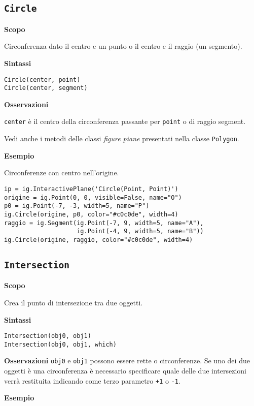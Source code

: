 \subsection{\texttt{Circle}}
\label{sub:geoint_circle}
\textbf{Scopo}

Circonferenza dato il centro e un punto o il centro e il raggio (un segmento).

\textbf{Sintassi}

\begin{lstlisting}
Circle(center, point)
Circle(center, segment)
\end{lstlisting}

\textbf{Osservazioni}

\texttt{center} è il centro della circonferenza passante per \texttt{point} o 
di raggio
segment.

Vedi anche i metodi delle classi \emph{figure piane} presentati nella classe
\texttt{Polygon}.

\textbf{Esempio}

Circonferenze con centro nell'origine.

\begin{lstlisting}
ip = ig.InteractivePlane('Circle(Point, Point)')
origine = ig.Point(0, 0, visible=False, name="O")
p0 = ig.Point(-7, -3, width=5, name="P")
ig.Circle(origine, p0, color="#c0c0de", width=4)
raggio = ig.Segment(ig.Point(-7, 9, width=5, name="A"),
                    ig.Point(-4, 9, width=5, name="B"))
ig.Circle(origine, raggio, color="#c0c0de", width=4)
\end{lstlisting}

\subsection{\texttt{Intersection}}
\label{sub:geoint_intersection}
\textbf{Scopo}

Crea il punto di intersezione tra due oggetti.

\textbf{Sintassi}

\begin{lstlisting}
Intersection(obj0, obj1)
Intersection(obj0, obj1, which)
\end{lstlisting}

\textbf{Osservazioni}
% 
\texttt{obj0} e \texttt{obj1} possono essere rette o circonferenze. Se uno dei 
due
oggetti è una circonferenza è necessario specificare quale delle due
intersezioni verrà restituita indicando come terzo parametro \texttt{+1} o 
\texttt{-1}.

\textbf{Esempio}

